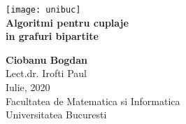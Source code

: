 \begin{titlepage}
  \vspace{1 in}
  \begin{center}
    \texttt{[image: unibuc]}
    \\
    \huge
    \textbf{Algoritmi pentru cuplaje \\ in grafuri bipartite} \\
    \vspace{0.8 in}

    \Large
    \textbf{Ciobanu Bogdan} \\
    Lect.dr. Irofti Paul \\

    \vspace*{\fill}
    Iulie, 2020 \\
    Facultatea de Matematica si Informatica\\
    Universitatea Bucuresti \\

  \end{center}
\end{titlepage}

